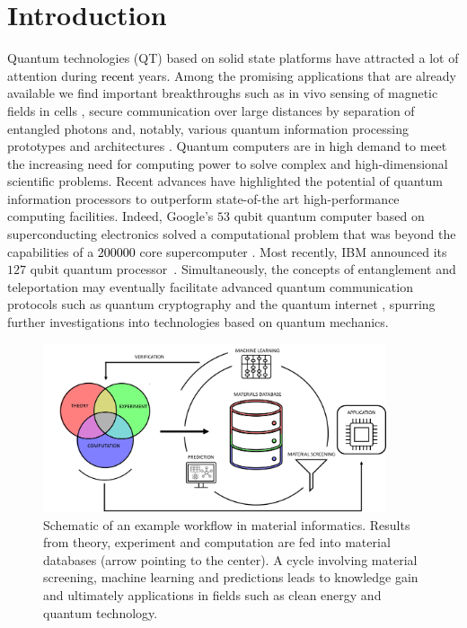 \documentclass[superscriptaddress,unsortedaddress,
 amsmath,amssymb,
 aps,
]{revtex4-2}
\newcommand{\mrk}[1]{\textcolor{black}{#1}}
\begin{document}
\section*{Introduction}
Quantum technologies (QT) based on solid state platforms have attracted a lot of attention during \mrk{recent}  years. 
Among the promising applications that are already available we find important breakthroughs such as in vivo sensing of magnetic fields in cells \cite{Lesage_2013}, secure communication over large distances by separation of entangled photons \cite{Ursin2007} and, notably, various quantum information processing prototypes and architectures \cite{Arute_2019}.  
Quantum computers are in high demand to meet the increasing need for computing power to solve complex and high-dimensional scientific problems. Recent advances have highlighted the potential of quantum information processors to outperform state-of-the art high-performance computing facilities.
Indeed, Google's $53$ qubit quantum computer based on superconducting electronics solved a computational problem that was beyond the capabilities of a \mrk{\num{200000}} core supercomputer \cite{Arute_2019}.
Most recently, IBM announced its $127$ qubit quantum processor~\cite{IBM2021}. Simultaneously, the concepts of entanglement and teleportation may eventually facilitate advanced quantum communication protocols such as quantum cryptography and the quantum internet \cite{quantum-internet-kimble}, spurring further investigations into technologies based on quantum mechanics.

\begin{figure}[t]
    \centering
    \includegraphics[width=0.9\textwidth]{figure1.png}
    \caption{Schematic of an example workflow in material informatics. Results from theory, experiment and computation are fed into material databases (arrow pointing to the center). A cycle involving material screening, machine learning and predictions leads to knowledge gain and ultimately applications in fields such as clean energy and quantum technology. 
    }
    \label{fig:ht-workflow}
\end{figure}
\end{document}
